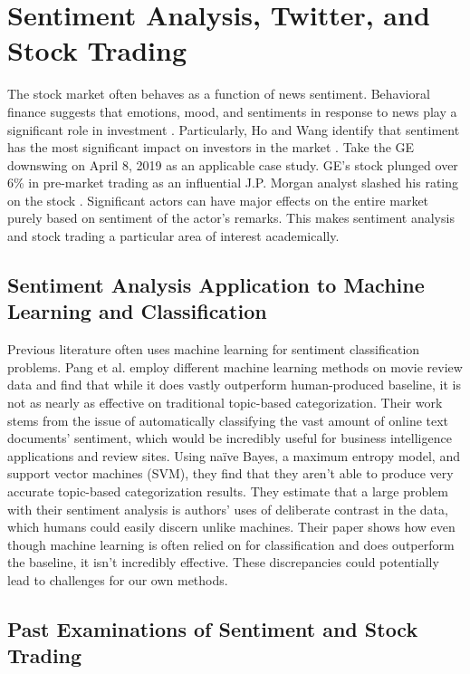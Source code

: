 \documentclass[../thesis.tex]{subfiles}
\begin{document}
\section{Sentiment Analysis, Twitter, and Stock Trading}

The stock market often behaves as a function of news sentiment. Behavioral finance suggests that emotions, mood, and sentiments in response to news play a significant role in investment \cite{Ho2016}. Particularly, Ho and Wang identify that sentiment has the most significant impact on investors in the market \cite{Ho2016}. Take the GE downswing on April 8, 2019 as an applicable case study. GE's stock plunged over 6\% in pre-market trading as an influential J.P. Morgan analyst slashed his rating on the stock \cite{Sozzi2019}. Significant actors can have major effects on the entire market purely based on sentiment of the actor's remarks. This makes sentiment analysis and stock trading a particular area of interest academically. 


\subsection{Sentiment Analysis Application to Machine Learning and Classification}

Previous literature often uses machine learning for sentiment classification problems. Pang et al. \cite{Pang} employ different machine learning methods on movie review data and find that while it does vastly outperform human-produced baseline, it is not as nearly as effective on traditional topic-based categorization. Their work stems from the issue of automatically classifying the vast amount of online text documents' sentiment, which would be incredibly useful for business intelligence applications and review sites. Using na\"{i}ve Bayes, a maximum entropy model, and support vector machines (SVM), they find that they aren't able to produce very accurate topic-based categorization results. They estimate that a large problem with their sentiment analysis is authors' uses of deliberate contrast in the data, which humans could easily discern unlike machines. Their paper shows how even though machine learning is often relied on for classification and does outperform the baseline, it isn't incredibly effective. These discrepancies could potentially lead to challenges for our own methods. 


\subsection{Past Examinations of Sentiment and Stock Trading}
\end{document}
